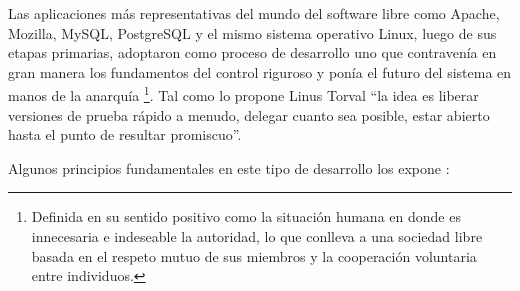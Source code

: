 Las aplicaciones más representativas del mundo del software libre como Apache, Mozilla, MySQL, PostgreSQL y el mismo sistema operativo Linux, luego de sus etapas primarias, adoptaron como proceso de desarrollo uno que contravenía en gran manera los fundamentos del control riguroso y ponía el futuro del sistema en manos de la anarquía \footnote{Definida en su sentido positivo como la situación humana en donde es innecesaria e indeseable la autoridad, lo que conlleva a una sociedad libre basada en el respeto mutuo de sus miembros y la cooperación voluntaria entre individuos.\cite{bce}}. Tal como lo propone Linus Torval “la idea es liberar versiones de prueba rápido a menudo, delegar cuanto sea posible, estar abierto hasta el punto de resultar promiscuo”.

Algunos principios fundamentales en este tipo de desarrollo los expone \cite{raymond}:

